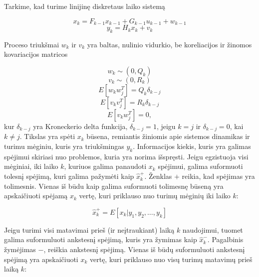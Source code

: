 \documentclass[12pt, a4paper, lithuanian]{article}
\begin{document}
        Tarkime, kad turime linijinę diskretaus laiko sistemą

        \begin{equation}
            x_k = F_{k-1}x_{k-1} + G_{k-1}u_{k-1} + w_{k-1}
        \end{equation}
        \begin{equation}
            y_k = H_k x_k + v_k
        \end{equation}

        Proceso triukšmai ${w_k}$ ir ${v_k}$ yra baltas, nulinio vidurkio, be koreliacijos ir žinomos kovariacijos matricos

        \begin{equation}
        w_k \sim (0, Q_k)
        \end{equation}
        \begin{equation}
        v_k \sim (0, R_k)
        \end{equation}
        \begin{equation}
        E[w_k w_j^T] = Q_k \delta_{k-j}
        \end{equation}
        \begin{equation}
        E[v_k v_j^T] = R_k\delta_{k-j}
        \end{equation}
        \begin{equation}
        E[v_k w_j^T] = 0,
        \end{equation}
        kur $\delta_{k-j}$ yra Kroneckerio delta funkcija, $\delta_{k-j} = 1$, jeigu $k=j$ ir $\delta_{k-j} = 0$, kai $k \neq j$.
        Tikslas yra spėti $x_k$ būsena, remiantis žiniomis apie sistemos dinamikas ir turimu mėginiu, kuris yra triukšmingas ${y_k}$.
        Informacijos kiekis, kuris yra galimas spėjimui skiriasi nuo problemos, kuria yra norima išspręsti.
        Jeigu egzistuoja visi mėginiai, iki laiko $k$, kuriuos galima panaudoti $x_k$ spėjimui, galima suformuoti tolesnį spėjimą, kuri galima pažymėti kaip $\hat{x}_k^{+}$.
        Ženklas $+$ reikia, kad spėjimas yra tolimesnis.
        Vienas iš būdu kaip galima suformuoti tolimesnę būseną yra apskaičiuoti spėjamą $x_k$ vertę, kuri priklauso nuo turimų mėginių iki laiko $k$:

        \begin{equation}
            \hat{x}_k^{+} = E[x_k|y_1,y_2, \dots , y_k]
        \end{equation}

        Jeigu turimi visi matavimai prieš (ir neįtraukiant) laiką $k$ naudojimui, tuomet galima suformuluoti ankstesnį spėjimą, kuris yra žymimas kaip $\hat{x}_k^{-}$.
        Pagalbinis žymėjimas $-$, reiškia ankstesnį spėjimą.
        Vienas iš būdų suformuluoti ankstesnį spėjimą yra apskaičiuoti $x_k$ vertę, kuri priklauso nuo visų turimų matavimų prieš laiką $k$:
\end{document}
